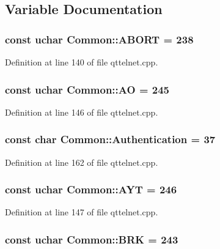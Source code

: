 \subsection{Variable Documentation}
\hypertarget{namespaceCommon_a3baeb5145a70bc3464d679dbf911b3fe}{
\subsubsection[{ABORT}]{\setlength{\rightskip}{0pt plus 5cm}const uchar {\bf Common::ABORT} = 238}}
\label{namespaceCommon_a3baeb5145a70bc3464d679dbf911b3fe}


Definition at line 140 of file qttelnet.cpp.

\hypertarget{namespaceCommon_a62f2f5457505cae888d9a4ea2f71f3b5}{
\subsubsection[{AO}]{\setlength{\rightskip}{0pt plus 5cm}const uchar {\bf Common::AO} = 245}}
\label{namespaceCommon_a62f2f5457505cae888d9a4ea2f71f3b5}


Definition at line 146 of file qttelnet.cpp.

\hypertarget{namespaceCommon_a11fb5ff669cc07e7d705f1cd70cb6d8c}{
\subsubsection[{Authentication}]{\setlength{\rightskip}{0pt plus 5cm}const char {\bf Common::Authentication} = 37}}
\label{namespaceCommon_a11fb5ff669cc07e7d705f1cd70cb6d8c}


Definition at line 162 of file qttelnet.cpp.

\hypertarget{namespaceCommon_a1975b22cd4d2c46ff86ef9df52b79c3b}{
\subsubsection[{AYT}]{\setlength{\rightskip}{0pt plus 5cm}const uchar {\bf Common::AYT} = 246}}
\label{namespaceCommon_a1975b22cd4d2c46ff86ef9df52b79c3b}


Definition at line 147 of file qttelnet.cpp.

\hypertarget{namespaceCommon_af6a16e62eae375dadc9f539d9593d02c}{
\subsubsection[{BRK}]{\setlength{\rightskip}{0pt plus 5cm}const uchar {\bf Common::BRK} = 243}}
\label{namespaceCommon_af6a16e62eae375dadc9f539d9593d02c}


